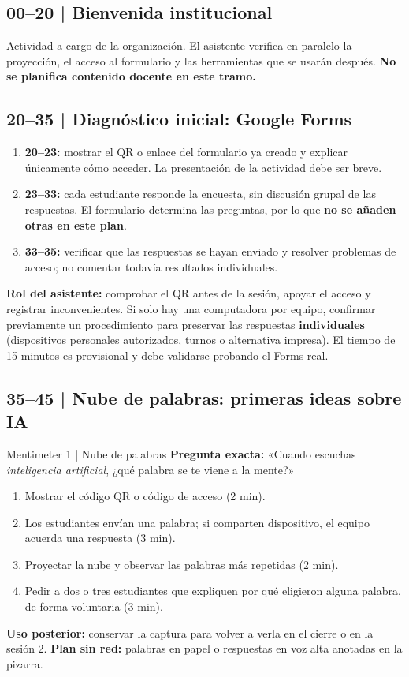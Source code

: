 \documentclass[11pt,a4paper]{article}
\begin{document}
\subsection{00--20 | Bienvenida institucional}
Actividad a cargo de la organización. El asistente verifica en paralelo la proyección, el acceso al formulario y las herramientas que se usarán después. \textbf{No se planifica contenido docente en este tramo.}

\subsection{20--35 | Diagnóstico inicial: Google Forms}
\begin{enumerate}
\item \textbf{20--23:} mostrar el QR o enlace del formulario ya creado y explicar únicamente cómo acceder. La presentación de la actividad debe ser breve.
\item \textbf{23--33:} cada estudiante responde la encuesta, sin discusión grupal de las respuestas. El formulario determina las preguntas, por lo que \textbf{no se añaden otras en este plan}.
\item \textbf{33--35:} verificar que las respuestas se hayan enviado y resolver problemas de acceso; no comentar todavía resultados individuales.
\end{enumerate}
\textbf{Rol del asistente:} comprobar el QR antes de la sesión, apoyar el acceso y registrar inconvenientes. Si solo hay una computadora por equipo, confirmar previamente un procedimiento para preservar las respuestas \textbf{individuales} (dispositivos personales autorizados, turnos o alternativa impresa). El tiempo de 15 minutos es provisional y debe validarse probando el Forms real.

\subsection{35--45 | Nube de palabras: primeras ideas sobre IA}
\begin{actividad}{Mentimeter 1 | Nube de palabras}
\textbf{Pregunta exacta:} «Cuando escuchas \emph{inteligencia artificial}, ¿qué palabra se te viene a la mente?»
\begin{enumerate}
\item Mostrar el código QR o código de acceso (2 min).
\item Los estudiantes envían una palabra; si comparten dispositivo, el equipo acuerda una respuesta (3 min).
\item Proyectar la nube y observar las palabras más repetidas (2 min).
\item Pedir a dos o tres estudiantes que expliquen por qué eligieron alguna palabra, de forma voluntaria (3 min).
\end{enumerate}
\textbf{Uso posterior:} conservar la captura para volver a verla en el cierre o en la sesión 2. \textbf{Plan sin red:} palabras en papel o respuestas en voz alta anotadas en la pizarra.
\end{actividad}
\end{document}
